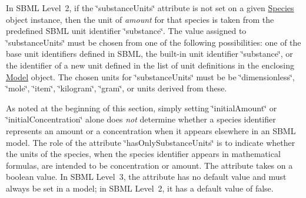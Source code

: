 In S\+B\+ML Level~2, if the \char`\"{}substance\+Units\char`\"{} attribute is not set on a given \hyperlink{class_species}{Species} object instance, then the unit of {\itshape amount} for that species is taken from the predefined S\+B\+ML unit identifier {\ttfamily \char`\"{}substance\char`\"{}}. The value assigned to \char`\"{}substance\+Units\char`\"{} must be chosen from one of the following possibilities\+: one of the base unit identifiers defined in S\+B\+ML, the built-\/in unit identifier {\ttfamily \char`\"{}substance\char`\"{}}, or the identifier of a new unit defined in the list of unit definitions in the enclosing \hyperlink{class_model}{Model} object. The chosen units for \char`\"{}substance\+Units\char`\"{} must be be {\ttfamily \char`\"{}dimensionless\char`\"{}}, {\ttfamily \char`\"{}mole\char`\"{}}, {\ttfamily \char`\"{}item\char`\"{}}, {\ttfamily \char`\"{}kilogram\char`\"{}}, {\ttfamily \char`\"{}gram\char`\"{}}, or units derived from these.

As noted at the beginning of this section, simply setting \char`\"{}initial\+Amount\char`\"{} or \char`\"{}initial\+Concentration\char`\"{} alone does {\itshape not} determine whether a species identifier represents an amount or a concentration when it appears elsewhere in an S\+B\+ML model. The role of the attribute \char`\"{}has\+Only\+Substance\+Units\char`\"{} is to indicate whether the units of the species, when the species identifier appears in mathematical formulas, are intended to be concentration or amount. The attribute takes on a boolean value. In S\+B\+ML Level~3, the attribute has no default value and must always be set in a model; in S\+B\+ML Level~2, it has a default value of {\ttfamily false}.

